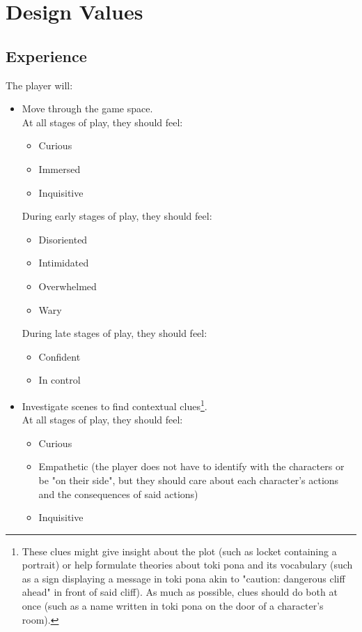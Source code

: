 \documentclass{scrartcl}
\begin{document}
	\section{Design Values}
		\subsection{Experience}
			The player will:
			\begin{itemize}
				\item Move through the game space. \\
				At all stages of play, they should feel:
				\begin{itemize}
					\item Curious
					\item Immersed
					\item Inquisitive
				\end{itemize}
				During early stages of play, they should feel: 
				\begin{itemize}
					\item Disoriented
					\item Intimidated
					\item Overwhelmed
					\item Wary
				\end{itemize}
				During late stages of play, they should feel:
				\begin{itemize}
					\item Confident
					\item In control
				\end{itemize}
				\item Investigate scenes to find contextual clues\footnote{These clues might give insight about the plot (such as locket containing a portrait) or help formulate theories about toki pona and its vocabulary (such as a sign displaying a message in toki pona akin to "caution: dangerous cliff ahead" in front of said cliff). As much as possible, clues should do both at once (such as a name written in toki pona on the door of a character's room).}.\\
				At all stages of play, they should feel:
				\begin{itemize}
					\item Curious
					\item Empathetic (the player does not have to identify with the characters or be "on their side", but they should care about each character's actions and the consequences of said actions)
					\item Inquisitive

\end{itemize}
\end{itemize}
\end{document}
